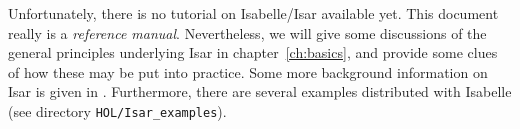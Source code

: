 Unfortunately, there is no tutorial on Isabelle/Isar available yet.  This
document really is a \emph{reference manual}.  Nevertheless, we will give some
discussions of the general principles underlying Isar in
chapter~\ref{ch:basics}, and provide some clues of how these may be put into
practice.  Some more background information on Isar is given in
\cite{Wenzel:1999:TPHOL}.  Furthermore, there are several examples distributed
with Isabelle (see directory \texttt{HOL/Isar_examples}).



